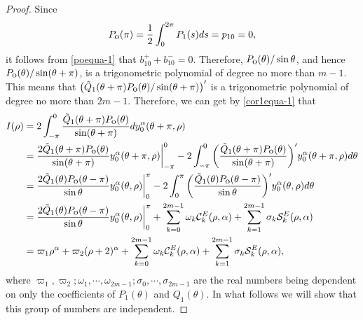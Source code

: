 \documentclass[11pt]{amsart}
\theoremstyle{remark}
\theoremstyle{definition}
\begin{document}
\begin{proof}
 Since   \begin{equation}\label{b1+--0} P_{\mbox{\small{o}}}(\pi)=\frac{1}{2}\int_{0}^{2\pi}P_1(s)ds=p_{10}=0,\end{equation}
 it follows from \eqref{poequa-1} that  $b_{10}
^++b_{10}^-=0$.
Therefore,   $P_{\mbox{\small{o}}}(\theta)/\sin \theta$, and hence $P_{\mbox{\small{o}}}(\theta)/\sin (\theta+\pi)$,
is  a trigonometric polynomial  of degree no more than $m-1$. This means that
 $\left(\tilde{Q}_1(\theta+\pi)P_{\mbox{\small{o}}}(\theta)/\sin (\theta+\pi)\right)'$ is a  trigonometric polynomial  of degree no more than $2m-1$. Therefore,
  we can get by  \eqref{cor1equa-1}   that
 \begin{equation} \label{cor1equa-2}
\begin{split}
I(\rho)&=2\int_{-\pi}^{0}\frac{\tilde{Q}_1(\theta+\pi)P_{\mbox{\small{o}}}(\theta)}{\sin (\theta+\pi)}dy_0^{\alpha}(\theta+\pi,\rho)\\
&=\frac{2\tilde{Q}_1(\theta+\pi)P_{\mbox{\small{o}}}(\theta)}{\sin (\theta+\pi)}y_0^{\alpha}(\theta+\pi,\rho)\bigg|_{-\pi}^0-2\int_{-\pi}^{0}\bigg(\frac{\tilde{Q}_1(\theta+\pi)P_{\mbox{\small{o}}}(\theta)}{\sin (\theta+\pi)}\bigg)' y_0^{\alpha}(\theta+\pi,\rho)d \theta\\
&=\frac{2\tilde{Q}_1(\theta)P_{\mbox{\small{o}}}(\theta-\pi)}{\sin \theta}y_0^{\alpha}(\theta,\rho)\bigg|_{0}^{\pi}-2\int_{0}^{\pi}\bigg(\frac{\tilde{Q}_1(\theta)P_{\mbox{\small{o}}}(\theta-\pi)}{\sin \theta}\bigg)' y_0^{\alpha}(\theta,\rho)d \theta\\
&= \frac{2\tilde{Q}_1(\theta)P_{\mbox{\small{o}}}(\theta-\pi)}{\sin \theta}y_0^{\alpha}(\theta,\rho)\bigg|_{0}^{\pi}+\sum_{k=0}^{2m-1}\omega_k\mathcal{C}_{k}^{E}(\rho,\alpha)+\sum_{k=1}^{2m-1}\sigma_k\mathcal{S}_{k}^{E}(\rho,\alpha)\\
& = \varpi_1 \rho^{\alpha}+\varpi_2(\rho+2)^{\alpha} +\sum_{k=0}^{2m-1}\omega_k\mathcal{C}_{k}^{E}(\rho,\alpha)+\sum_{k=1}^{2m-1}\sigma_k\mathcal{S}_{k}^{E}(\rho,\alpha),\end{split}\end{equation}
where $ \varpi_1,  \varpi_2; \omega_1,\cdots, \omega_{2m-1};\sigma_0,\cdots,\sigma_{2m-1}$ are the real numbers being dependent on only the coefficients of $P_1(\theta)$ and $Q_1(\theta)$. In what follows we will
show that this group of numbers are independent.


\end{proof}
\end{document}
